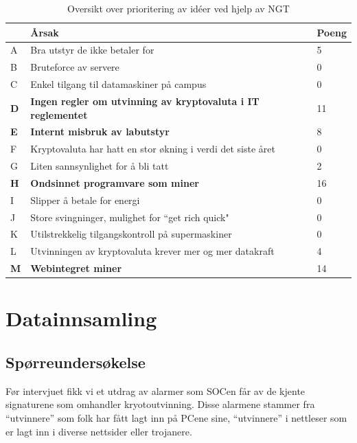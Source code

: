 \begin{table} [H]
    \begin{tabular}{ | m{2em} | m{30em} | m{3em} | }
        \hline
            \cellcolor{yellow}  & \cellcolor{yellow} \textbf{Årsak} & \cellcolor{yellow} Poeng \\
        \hline
           A& Bra utstyr de ikke betaler for & 5 \\
        \hline
          B & Bruteforce av servere & 0 \\
        \hline
          C & Enkel tilgang til datamaskiner på campus & 0 \\
        \hline
         \textbf{D} & \textbf{Ingen regler om utvinning av kryptovaluta i IT reglementet} & 11 \\
        \hline
          \textbf{E} & \textbf{Internt misbruk av labutstyr} & 8  \\
        \hline
          F & Kryptovaluta har hatt en stor økning i verdi det siste året & 0 \\
        \hline
         G & Liten sannsynlighet for å bli tatt & 2 \\
        \hline
         \textbf{H} & \textbf{Ondsinnet programvare som miner} &  16 \\
        \hline
         I & Slipper å betale for energi & 0 \\
        \hline
         J & Store svingninger, mulighet for “get rich quick" & 0 \\
        \hline
         K & Utilstrekkelig tilgangskontroll på supermaskiner & 0 \\
        \hline
         L & Utvinningen av kryptovaluta krever mer og mer datakraft & 4 \\
        \hline
         \textbf{M} & \textbf{Webintegret miner} & 14 \\
        \hline
    \end{tabular}
    \caption{Oversikt over prioritering av idéer ved hjelp av NGT}
    \label{tab:NGT}
\end{table}
\section{Datainnsamling}
\subsection{Spørreundersøkelse}
Før intervjuet fikk vi et utdrag av alarmer som SOCen får av de kjente signaturene som omhandler kryotoutvinning. Disse alarmene stammer fra ``utvinnere'' som folk har fått lagt inn på PCene sine, ``utvinnere'' i nettleser som er lagt inn i diverse nettsider eller trojanere. 

